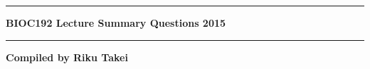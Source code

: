 \documentclass[a4paper,12pt]{report}
\newcommand{\HRule}{\rule {\linewidth}{0.5mm}}
\begin{document}
\begin{titlepage}

\begin{center}

\HRule
\vspace{0.4cm}
\Huge{\textbf{BIOC192 Lecture Summary Questions 2015}}
\HRule

\vfill
\LARGE{\textbf{Compiled by Riku Takei}}

\end{center}

\end{titlepage}


















\end{document}
